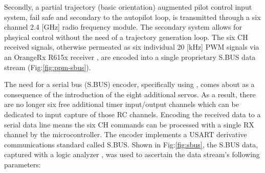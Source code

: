 \par
Secondly, a partial trajectory (basic orientation) augmented pilot control input system, fail safe and secondary to the autopilot loop, is transmitted through a six channel 2.4 [GHz] radio frequency module. The secondary system allows for phsyical control without the need of a trajectory generation loop. The six CH received signals, otherwise permeated as six individual 20 [kHz] PWM signals via an OrangeRx R615x receiver \cite{r615x}, are encoded into a single proprietary S.BUS data stream (Fig:\ref{fig:ppm-sbus}). 
\par
The need for a serial bus (S.BUS) encoder, specifically using \cite{sbusencoder}, comes about as a consequence of the introduction of the eight additional servos. As a result, there are no longer six free additional timer input/output channels which can be dedicated to input capture of those RC channels. Encoding the received data to a serial data line means the six CH commands can be processed with a single RX channel by the microcontroller. The encoder implements a USART derivative communications standard called S.BUS. Shown in Fig:\ref{fig:sbus}, the S.BUS data, captured with a logic analyzer \cite{saleae}, was used to ascertain the data stream's following parameters:
\par
